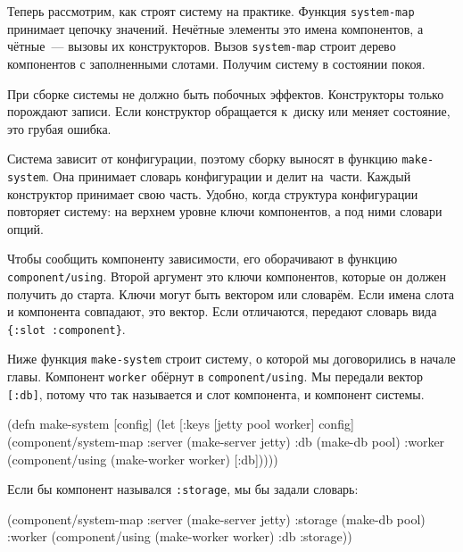 
Теперь рассмотрим, как строят систему на практике. Функция \verb|system-map|
принимает цепочку значений. Нечётные элементы это имена компонентов, а
чётные~--- вызовы их конструкторов. Вызов \verb|system-map| строит дерево
компонентов с заполненными слотами. Получим систему в состоянии покоя.


При сборке системы не должно быть побочных эффектов. Конструкторы только
порождают записи. Если конструктор обращается к~диску или меняет состояние, это
грубая ошибка.

Система зависит от конфигурации, поэтому сборку выносят в функцию
\verb|make-system|. Она принимает словарь конфигурации и делит на~части. Каждый
конструктор принимает свою часть. Удобно, когда структура конфигурации повторяет
систему: на верхнем уровне ключи компонентов, а под ними словари опций.

Чтобы сообщить компоненту зависимости, его оборачивают в функцию
\verb|component/using|. Второй аргумент это ключи компонентов, которые он
должен получить до старта. Ключи могут быть вектором или словарём. Если имена
слота и компонента совпадают, это вектор. Если отличаются, передают словарь вида
\verb|{:slot :component}|.

Ниже функция \verb|make-system| строит систему, о которой мы договорились в
начале главы. Компонент \verb|worker| обёрнут в \verb|component/using|. Мы
передали вектор \verb|[:db]|, потому что так называется и слот компонента, и
компонент системы.

\begin{english}
  \begin{clojure}
(defn make-system
  [config]
  (let [{:keys [jetty pool worker]} config]
    (component/system-map
     :server (make-server jetty)
     :db     (make-db pool)
     :worker (component/using
              (make-worker worker) [:db]))))
  \end{clojure}
\end{english}


\noindent
Если бы компонент назывался \verb|:storage|, мы бы задали словарь:

\begin{english}
  \begin{clojure}
(component/system-map
 :server  (make-server jetty)
 :storage (make-db pool)
 :worker  (component/using
           (make-worker worker) {:db :storage}))
  \end{clojure}
\end{english}

